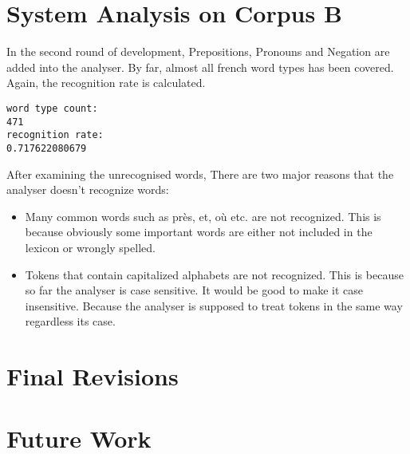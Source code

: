 \documentclass[11pt,letterpaper]{article}
\begin{document}
\section{System Analysis on Corpus B}
In the second round of development, Prepositions, Pronouns and Negation are added into the analyser. By far, almost all french word types has been covered. Again, the recognition rate is calculated.\\

\begin{verbatim}
word type count:
471
recognition rate:
0.717622080679
\end{verbatim} 
After examining the unrecognised words, There are two major reasons that the analyser doesn't recognize words:\\
\begin{itemize}
\item Many common words such as près, et, où etc. are not recognized. This is because obviously some important words are either not included in the lexicon or wrongly spelled.
\item Tokens that contain capitalized alphabets are not recognized. This is because so far the analyser is case sensitive. It would be good to make it case insensitive. Because the analyser is supposed to treat tokens in the same way regardless its case.
\end{itemize}
\section{Final Revisions}

\section{Future Work}







\label{lastpage}
\end{document}
